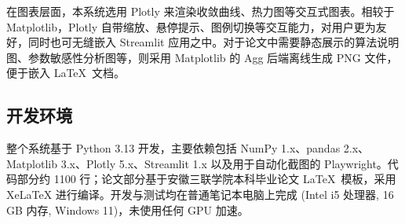 在图表层面，本系统选用 Plotly 来渲染收敛曲线、热力图等交互式图表。相较于 Matplotlib，Plotly 自带缩放、悬停提示、图例切换等交互能力，对用户更为友好，同时也可无缝嵌入 Streamlit 应用之中。对于论文中需要静态展示的算法说明图、参数敏感性分析图等，则采用 Matplotlib 的 Agg 后端离线生成 PNG 文件，便于嵌入 \LaTeX\ 文档。

\subsection{开发环境}

整个系统基于 Python 3.13 开发，主要依赖包括 NumPy 1.x、pandas 2.x、Matplotlib 3.x、Plotly 5.x、Streamlit 1.x 以及用于自动化截图的 Playwright。代码部分约 1100 行；论文部分基于安徽三联学院本科毕业论文 \LaTeX\ 模板，采用 XeLaTeX 进行编译。开发与测试均在普通笔记本电脑上完成 (Intel i5 处理器, 16 GB 内存, Windows 11)，未使用任何 GPU 加速。
